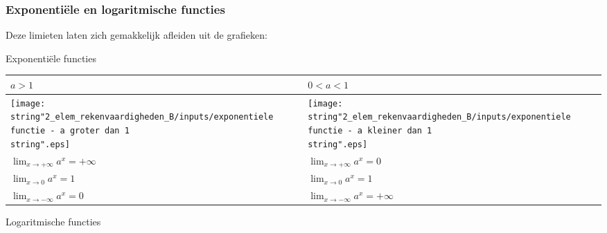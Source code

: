 \medskip{}




\subsubsection{Exponenti\"ele en logaritmische functies}

Deze limieten laten zich gemakkelijk afleiden uit de grafieken:

\noindent Exponenti\"ele functies

\begin{table}[ht]
	\centering
	\begin{tabular}{|l||l|}
		\hline 
		$a>1$ &  $0<a<1$\\
		\hline 
		\texttt{[image: \\string"2\_elem\_rekenvaardigheden\_B/inputs/exponentiele functie - a groter dan 1\\string".eps]} &  \texttt{[image: \\string"2\_elem\_rekenvaardigheden\_B/inputs/exponentiele functie - a kleiner dan 1\\string".eps]}\\
		\hline 
		${\displaystyle \lim_{x\to+\infty}}a^{x}=+\infty$ &  ${\displaystyle \lim_{x\to+\infty}}a^{x}=0$\\
		\hline 
		${\displaystyle \lim_{x\to0}}a^{x}=1$ &  ${\displaystyle \lim_{x\to0}}a^{x}=1$\\
		\hline 
		${\displaystyle \lim_{x\to-\infty}}a^{x}=0$ &  ${\displaystyle \lim_{x\to-\infty}}a^{x}=+\infty$\\
		\hline 
	\end{tabular}
\end{table}


\medskip{}


\noindent Logaritmische functies

